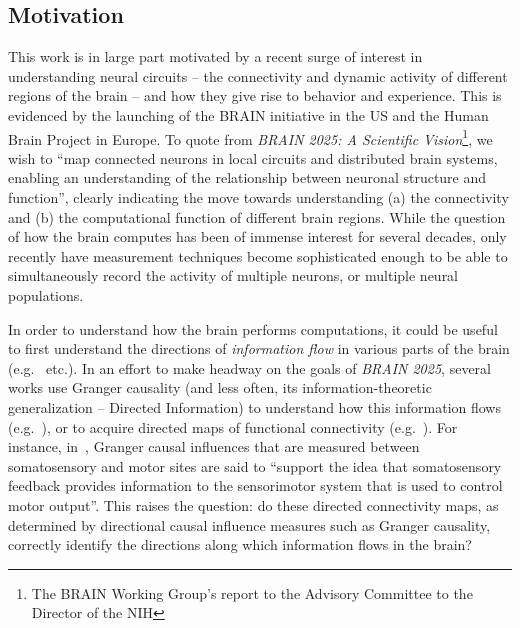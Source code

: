 \documentclass[letterpaper, 10pt, conference]{ieeeconf}
\begin{document}
\subsection{Motivation}
\label{sec:motivation}

This work is in large part motivated by a recent surge of interest in understanding neural circuits -- the connectivity and dynamic activity of different regions of the brain -- and how they give rise to behavior and experience. This is evidenced by the launching of the BRAIN initiative in the US and the Human Brain Project in Europe. To quote from \emph{BRAIN 2025: A Scientific Vision}\footnote{The BRAIN Working Group's report to the Advisory Committee to the Director of the NIH}, we wish to ``map connected neurons in local circuits and distributed brain systems, enabling an understanding of the relationship between neuronal structure and function'', clearly indicating the move towards understanding (a) the connectivity and (b) the computational function of different brain regions. While the question of how the brain computes has been of immense interest for several decades, only recently have measurement techniques become sophisticated enough to be able to simultaneously record the activity of multiple neurons, or multiple neural populations.

In order to understand how the brain performs computations, it could be useful to first understand the directions of \emph{information flow} in various parts of the brain (e.g.~\cite{blinowska2004granger,dhamala2008analyzing,nolte2008robustly,korzeniewska2003determination,schippers2010mapping} etc.). In an effort to make headway on the goals of \emph{BRAIN 2025}, several works use Granger causality (and less often, its information-theoretic generalization -- Directed Information) to understand how this information flows (e.g.~\cite{Brovelli2004BetaOscillations,goebel2003investigating,deshpande2008effective}), or to acquire directed maps of functional connectivity (e.g.~\cite{friston2013analysing,goebel2003investigating,deshpande2008effective}). For instance, in~\cite{Brovelli2004BetaOscillations}, Granger causal influences that are measured between somatosensory and motor sites are said to ``support the idea that somatosensory feedback provides information to the sensorimotor system that is used to control motor output''. This raises the question: do these directed connectivity maps, as determined by directional causal influence measures such as Granger causality, correctly identify the directions along which information flows in the brain?
\end{document}
